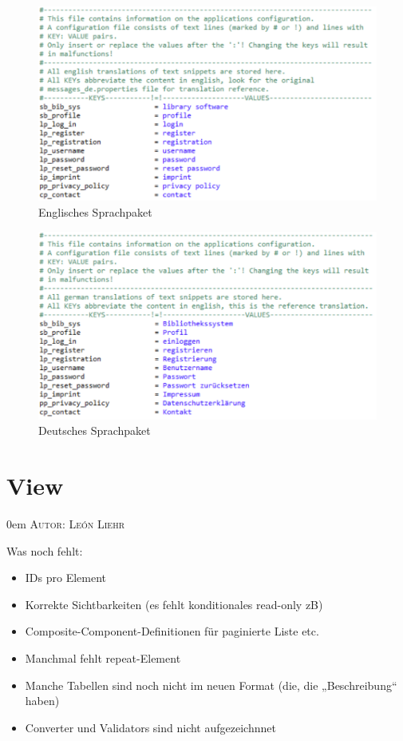 \documentclass{article}
\makeatletter
\newcommand{\sectionauthor}[1]{
	{\parindent 0em \large \scshape Autor: #1 \par \nobreak \vspace*{1em}}
	\@afterheading
}
\makeatother
\begin{document}
\begin{figure}[H]
\hypertarget{messagesen}{}
\centering
\includegraphics[width=50em]{messagesen}
\caption{Englisches Sprachpaket}
\end{figure}

\begin{figure}[H]
\hypertarget{messagesde}{}
\centering
\includegraphics[width=50em]{messagesde}
\caption{Deutsches Sprachpaket}
\end{figure}



\section{View}
\sectionauthor{León Liehr}

Was noch fehlt:

\begin{itemize}
    \item IDs pro Element
    \item Korrekte Sichtbarkeiten (es fehlt konditionales read-only zB)
    \item Composite-Component-Definitionen für paginierte Liste etc.
    \item Manchmal fehlt repeat-Element
    \item Manche Tabellen sind noch nicht im neuen Format (die, die „Beschreibung“ haben)
    \item Converter und Validators sind nicht aufgezeichnnet
\end{itemize}
\end{document}
